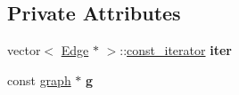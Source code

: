 \subsection*{Private Attributes}
\begin{DoxyCompactItemize}
\item 
\hypertarget{classedge__iterator_a22baab039b9d1120d8cd8a4d050cd7e1}{vector$<$ \hyperlink{structEdge}{Edge} $\ast$ $>$\+::\hyperlink{classconst__iterator}{const\+\_\+iterator} {\bfseries iter}}\label{classedge__iterator_a22baab039b9d1120d8cd8a4d050cd7e1}

\item 
\hypertarget{classedge__iterator_ade91a115d24388f911e8e6fc6bc982ad}{const \hyperlink{classgraph}{graph} $\ast$ {\bfseries g}}\label{classedge__iterator_ade91a115d24388f911e8e6fc6bc982ad}

\end{DoxyCompactItemize}
